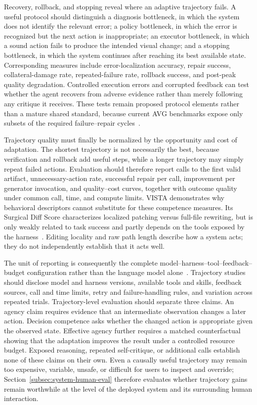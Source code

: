 Recovery, rollback, and stopping reveal where an adaptive trajectory fails. A useful protocol should distinguish a diagnosis bottleneck, in which the system does not identify the relevant error; a policy bottleneck, in which the error is recognized but the next action is inappropriate; an executor bottleneck, in which a sound action fails to produce the intended visual change; and a stopping bottleneck, in which the system continues after reaching its best available state. Corresponding measures include error-localization accuracy, repair success, collateral-damage rate, repeated-failure rate, rollback success, and post-peak quality degradation. Controlled execution errors and corrupted feedback can test whether the agent recovers from adverse evidence rather than merely following any critique it receives. These tests remain proposed protocol elements rather than a mature shared standard, because current AVG benchmarks expose only subsets of the required failure--repair cycles~\cite{avg260601057,avg260526144,avg260608091}.

Trajectory quality must finally be normalized by the opportunity and cost of adaptation. The shortest trajectory is not necessarily the best, because verification and rollback add useful steps, while a longer trajectory may simply repeat failed actions. Evaluation should therefore report calls to the first valid artifact, unnecessary-action rate, successful repair per call, improvement per generator invocation, and quality--cost curves, together with outcome quality under common call, time, and compute limits. VISTA demonstrates why behavioral descriptors cannot substitute for these competence measures. Its Surgical Diff Score characterizes localized patching versus full-file rewriting, but is only weakly related to task success and partly depends on the tools exposed by the harness~\cite{avg260526144}. Editing locality and raw path length describe how a system acts; they do not independently establish that it acts well.

The unit of reporting is consequently the complete model--harness--tool--feedback--budget configuration rather than the language model alone~\cite{avg260605525,avg260526144}. Trajectory studies should disclose model and harness versions, available tools and skills, feedback sources, call and time limits, retry and failure-handling rules, and variation across repeated trials. Trajectory-level evaluation should separate three claims. An agency claim requires evidence that an intermediate observation changes a later action. Decision competence asks whether the changed action is appropriate given the observed state. Effective agency further requires a matched counterfactual showing that the adaptation improves the result under a controlled resource budget. Exposed reasoning, repeated self-critique, or additional calls establish none of these claims on their own. Even a causally useful trajectory may remain too expensive, variable, unsafe, or difficult for users to inspect and override; Section~\ref{subsec:system-human-eval} therefore evaluates whether trajectory gains remain worthwhile at the level of the deployed system and its surrounding human interaction.


